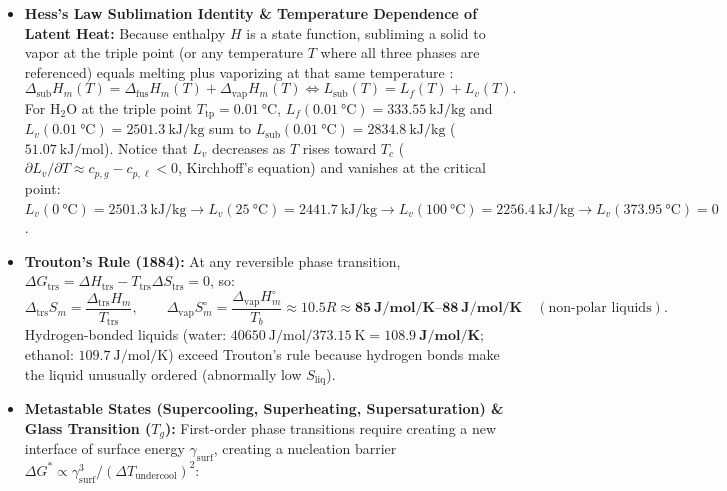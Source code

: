 \begin{itemize}
  \item \textbf{Hess's Law Sublimation Identity \& Temperature Dependence of Latent Heat:} Because enthalpy $H$ is a state function, subliming a solid to vapor at the triple point (or any temperature $T$ where all three phases are referenced) equals melting plus vaporizing at that same temperature :
  \begin{equation}\label{eq:05:sublimation}
    \Delta_{\mathrm{sub}}H_m(T) = \Delta_{\mathrm{fus}}H_m(T) + \Delta_{\mathrm{vap}}H_m(T) \iff L_{\mathrm{sub}}(T) = L_f(T) + L_v(T).
  \end{equation}
  For $\mathrm{H_2O}$ at the triple point $T_{\mathrm{tp}} = \SI{0.01}{\celsius}$, $L_f(\SI{0.01}{\celsius}) = \SI{333.55}{\kilo\joule\per\kilogram}$ and $L_v(\SI{0.01}{\celsius}) = \SI{2501.3}{\kilo\joule\per\kilogram}$ sum to $L_{\mathrm{sub}}(\SI{0.01}{\celsius}) = \SI{2834.8}{\kilo\joule\per\kilogram}$ ($\SI{51.07}{\kilo\joule\per\mole}$). Notice that $L_v$ decreases as $T$ rises toward $T_c$ ($\partial L_v/\partial T \approx c_{p,g} - c_{p,\ell} < 0$, Kirchhoff's equation) and vanishes at the critical point: $L_v(\SI{0}{\celsius}) = \SI{2501.3}{\kilo\joule\per\kilogram} \to L_v(\SI{25}{\celsius}) = \SI{2441.7}{\kilo\joule\per\kilogram} \to L_v(\SI{100}{\celsius}) = \SI{2256.4}{\kilo\joule\per\kilogram} \to L_v(\SI{373.95}{\celsius}) = 0$.
  \item \textbf{Trouton's Rule (1884):} At any reversible phase transition, $\Delta G_{\mathrm{trs}} = \Delta H_{\mathrm{trs}} - T_{\mathrm{trs}}\Delta S_{\mathrm{trs}} = 0$, so:
  \begin{equation}\label{eq:05:trouton}
    \Delta_{\mathrm{trs}}S_m = \frac{\Delta_{\mathrm{trs}}H_m}{T_{\mathrm{trs}}}, \qquad
    \Delta_{\mathrm{vap}}S_m^\circ = \frac{\Delta_{\mathrm{vap}}H_m^\circ}{T_b} \approx 10.5 R \approx \mathbf{\SIrange{85}{88}{\joule\per\mole\per\kelvin}} \quad (\text{non-polar liquids}).
  \end{equation}
  Hydrogen-bonded liquids (water: $\SI{40650}{\joule\per\mole}/\SI{373.15}{\kelvin} = \mathbf{\SI{108.9}{\joule\per\mole\per\kelvin}}$; ethanol: $\SI{109.7}{\joule\per\mole\per\kelvin}$) exceed Trouton's rule because hydrogen bonds make the liquid unusually ordered (abnormally low $S_{\mathrm{liq}}$).
  \item \textbf{Metastable States (Supercooling, Superheating, Supersaturation) \& Glass Transition ($T_g$):}
  First-order phase transitions require creating a new interface of surface energy $\gamma_{\mathrm{surf}}$, creating a nucleation barrier $\Delta G^* \propto \gamma_{\mathrm{surf}}^3 / (\Delta T_{\mathrm{undercool}})^2$:

\end{itemize}
